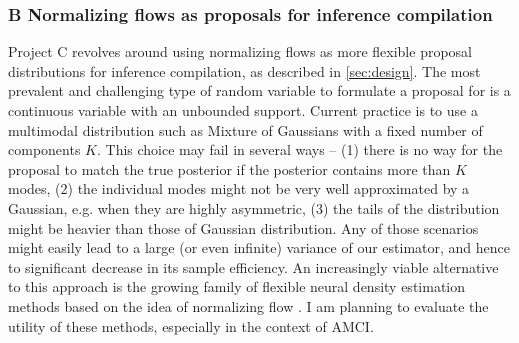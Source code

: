 \documentclass[12pt]{article}
\begin{document}
\subsubsection*{B \quad Normalizing flows as proposals for inference compilation}
Project C revolves around using normalizing flows as more flexible proposal distributions for inference compilation, as described in \autoref{sec:design}.
The most prevalent and challenging type of random variable to formulate a proposal for is a continuous variable with an unbounded support.
Current practice is to use a multimodal distribution such as Mixture of Gaussians with a fixed number of components $K$.
This choice may fail in several ways -- 
(1) there is no way for the proposal to match the true posterior if the posterior contains more than $K$ modes,
(2) the individual modes might not be very well approximated by a Gaussian, e.g. when they are highly asymmetric,
(3) the tails of the distribution might be heavier than those of Gaussian distribution.
Any of those scenarios might easily lead to a large (or even infinite) variance of our estimator, and hence to significant decrease in its sample efficiency.
An increasingly viable alternative to this approach is the growing family of flexible neural density estimation methods based on the idea of normalizing flow \citep{RezendeMohamed2015}.
I am planning to evaluate the utility of these methods, especially in the context of AMCI. 
\end{document}
